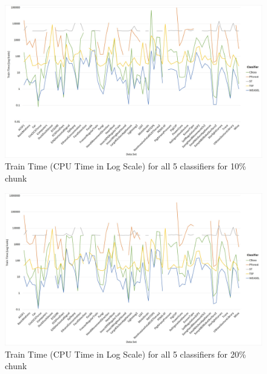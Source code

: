   \begin{figure} [!htb]
    \centering
    \includegraphics[width=\textwidth]{./Chapters/06 Results/Duration_10pct.jpg}
    \caption{Train Time (CPU Time in Log Scale) for all 5 classifiers for 10\% chunk}
    \label{fig:Duration10Line}
  \end{figure}
  
  \begin{figure} [!htb]
    \centering
    \includegraphics[width=\textwidth]{./Chapters/06 Results/Duration_20pct.jpg}
    \caption{Train Time (CPU Time in Log Scale) for all 5 classifiers for 20\% chunk}
    \label{fig:Duration20Line}
  \end{figure}
  
